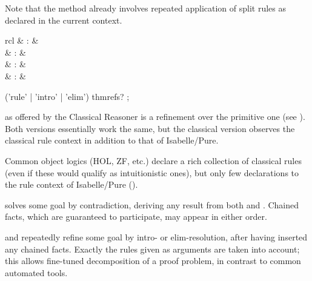 \begin{isabellebody}
\begin{isamarkuptext}
\begin{descr}
  Note that the \mbox{} method already involves repeated
  application of split rules as declared in the current context.

  \end{descr}%
\end{isamarkuptext}%
\isamarkuptrue%
%
\isamarkuptrue%
%
\isamarkuptrue%
%
\begin{isamarkuptext}%
\begin{matharray}{rcl}
    \mbox{} & : & \isarmeth \\
    \mbox{} & : & \isarmeth \\
    \mbox{} & : & \isarmeth \\
    \mbox{} & : & \isarmeth \\
  \end{matharray}

  \begin{rail}
    ('rule' | 'intro' | 'elim') thmrefs?
    ;
  \end{rail}

  \begin{descr}

  \item [\mbox{\isa{rule}}] as offered by the Classical Reasoner is a
  refinement over the primitive one (see ).
  Both versions essentially work the same, but the classical version
  observes the classical rule context in addition to that of
  Isabelle/Pure.

  Common object logics (HOL, ZF, etc.) declare a rich collection of
  classical rules (even if these would qualify as intuitionistic
  ones), but only few declarations to the rule context of
  Isabelle/Pure ().

  \item [\mbox{\isa{contradiction}}] solves some goal by contradiction,
  deriving any result from both  and .  Chained
  facts, which are guaranteed to participate, may appear in either
  order.

  \item [\mbox{\isa{intro}} and \mbox{\isa{elim}}] repeatedly refine
  some goal by intro- or elim-resolution, after having inserted any
  chained facts.  Exactly the rules given as arguments are taken into
  account; this allows fine-tuned decomposition of a proof problem, in
  contrast to common automated tools.


\end{descr}
\end{isamarkuptext}
\end{isabellebody}
